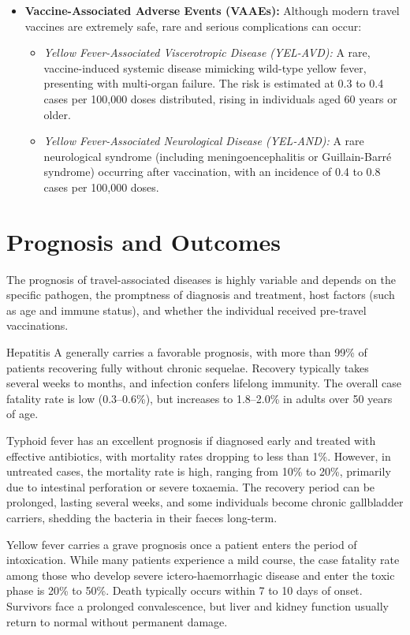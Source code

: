 \begin{itemize}
    \item \textbf{Vaccine-Associated Adverse Events (VAAEs):} Although modern travel vaccines are extremely safe, rare and serious complications can occur:
    \begin{itemize}
        \item \textit{Yellow Fever-Associated Viscerotropic Disease (YEL-AVD):} A rare, vaccine-induced systemic disease mimicking wild-type yellow fever, presenting with multi-organ failure. The risk is estimated at 0.3 to 0.4 cases per 100,000 doses distributed, rising in individuals aged 60 years or older.
        \item \textit{Yellow Fever-Associated Neurological Disease (YEL-AND):} A rare neurological syndrome (including meningoencephalitis or Guillain-Barr\'{e} syndrome) occurring after vaccination, with an incidence of 0.4 to 0.8 cases per 100,000 doses.
    \end{itemize}
\end{itemize}

\section*{Prognosis and Outcomes}
The prognosis of travel-associated diseases is highly variable and depends on the specific pathogen, the promptness of diagnosis and treatment, host factors (such as age and immune status), and whether the individual received pre-travel vaccinations.

Hepatitis A generally carries a favorable prognosis, with more than 99\% of patients recovering fully without chronic sequelae. Recovery typically takes several weeks to months, and infection confers lifelong immunity. The overall case fatality rate is low (0.3--0.6\%), but increases to 1.8--2.0\% in adults over 50 years of age.

Typhoid fever has an excellent prognosis if diagnosed early and treated with effective antibiotics, with mortality rates dropping to less than 1\%. However, in untreated cases, the mortality rate is high, ranging from 10\% to 20\%, primarily due to intestinal perforation or severe toxaemia. The recovery period can be prolonged, lasting several weeks, and some individuals become chronic gallbladder carriers, shedding the bacteria in their faeces long-term.

Yellow fever carries a grave prognosis once a patient enters the period of intoxication. While many patients experience a mild course, the case fatality rate among those who develop severe ictero-haemorrhagic disease and enter the toxic phase is 20\% to 50\%. Death typically occurs within 7 to 10 days of onset. Survivors face a prolonged convalescence, but liver and kidney function usually return to normal without permanent damage.

